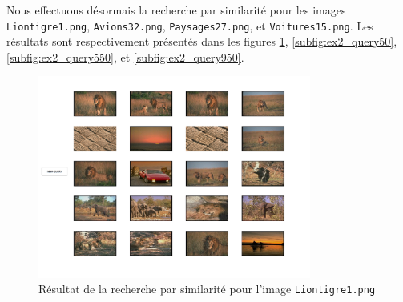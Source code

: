 \documentclass[a4paper]{article}
\begin{document}
Nous effectuons désormais la recherche par similarité pour les images
\texttt{Liontigre1.png}, \texttt{Avions32.png}, \texttt{Paysages27.png}, et
\texttt{Voitures15.png}. Les résultats sont respectivement présentés dans les
figures \ref{fig:ex2_query350}, \ref{subfig:ex2_query50},
\ref{subfig:ex2_query550}, et \ref{subfig:ex2_query950}.

\begin{figure}[H]
    \center
    \includegraphics[width=0.8\textwidth]{images/query350.png}
    \caption{Résultat de la recherche par similarité pour l'image
    \texttt{Liontigre1.png}}
    \label{fig:ex2_query350}
\end{figure}
\end{document}
